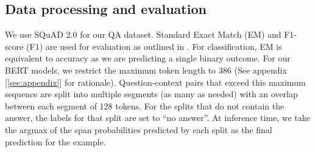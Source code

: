 \subsection{Data processing and evaluation}

We use SQuAD 2.0 for our QA dataset. Standard Exact Match (EM) and F1-score (F1) are used for evaluation as outlined in \cite{DBLP:journals/corr/abs-1806-03822}. For classification, EM is equivalent to accuracy as we are predicting a single binary outcome. For our BERT models, we restrict the maximum token length to 386 (See appendix [\ref{sec:appendix}] for rationale). Question-context pairs that exceed this maximum sequence are split into multiple segments (as many as needed) with an overlap between each segment of 128 tokens. For the splits that do not contain the answer, the labels for that split are set to “no answer”. At inference time, we take the argmax of the span probabilities predicted by each split as the final prediction for the example.
